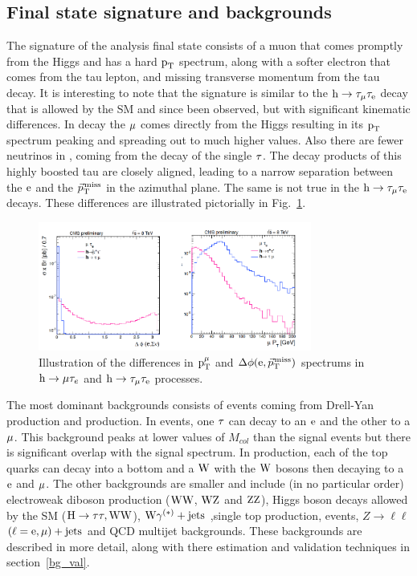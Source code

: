 \subsection{Final state signature and backgrounds}
\label{h125_evt_selec}
The signature of the \hmue analysis final state consists of a muon that comes promptly from the Higgs and has a hard $\text{p}_\text{T}$ spectrum, along with a softer electron that comes from the tau lepton, and missing transverse momentum from the tau decay. It is interesting to note that the signature is similar to the $\text{h} \to \tau_{\mu}\tau_{\text{e}}$ decay that is allowed by the SM and since been observed, but with significant kinematic differences. In \hmue decay the $\mu$ comes directly from the Higgs resulting in its $\text{p}_\text{T}$ spectrum peaking and spreading out to much higher values. Also there are fewer neutrinos in \hmue, coming from the decay of the single $\tau$. The decay products of this highly boosted tau are closely aligned, leading to a narrow separation between the $\text{e}$ and the ${\vec p}_{\mathrm{T}}^{\kern1pt\text{miss}}$ in the azimuthal plane. The same is not true in the $\text{h} \to \tau_{\mu}\tau_{\text{e}}$ decays. These differences are illustrated pictorially in Fig.~\ref{fig:htt_v_lfv}.






\begin{figure}
\begin{center}
\includegraphics[width=0.8\textwidth,keepaspectratio]{plots_and_figures/chapter5/htt_v_lfv.pdf}
\caption{Illustration of the differences in $\text{p}_\text{T}^{\mu}$ and $\Delta\phi(\text{e}, {\vec p}_{\mathrm{T}}^{\kern1pt\text{miss}})$ spectrums in $\text{h} \to \mu \tau_{e}$ and $\text{h} \to \tau_{\mu}\tau_{\text{e}}$ processes.}
\label{fig:htt_v_lfv}
\end{center}
\end{figure}

The most dominant backgrounds consists of \ztt events coming from Drell-Yan production and \ttb production. In \ztt events, one $\tau$ can decay to an $\text{e}$ and the other to a $\mu$. This background peaks at lower values of $M_{col}$ than the signal events but there is significant overlap with the signal spectrum. In \ttb production, each of the top quarks can decay into a bottom and a $\text{W}$ with the $\text{W}$ bosons then decaying to a $\text{e}$ and $\mu$. The other backgrounds are smaller and include (in no particular order) electroweak diboson production ($\text{W}\text{W}$, $\text{W}\text{Z}$ and $\text{Z}\text{Z}$), Higgs boson decays allowed by the SM ($\text{H} \to \tau\tau,\text{W}\text{W}$), $\text{W}\gamma^{(*)}+\text{jets}$ ,single top production, \wjets events, $Z\to\ell\ell$ $(\ell = \text{e}, \mu)+\text{jets}$ and QCD multijet backgrounds. These backgrounds are described in more detail, along with there estimation and validation techniques in section~\ref{bg_val}.        


